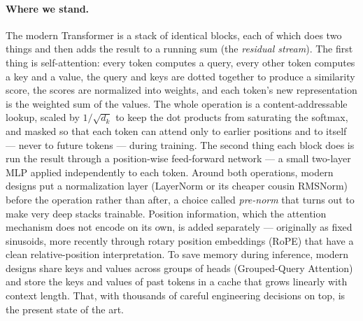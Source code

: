 \paragraph{Where we stand.}
The modern Transformer is a stack of identical blocks, each of which
does two things and then adds the result to a running sum (the
\emph{residual stream}). The first thing is self-attention: every
token computes a query, every other token computes a key and a
value, the query and keys are dotted together to produce a similarity
score, the scores are normalized into weights, and each token's new
representation is the weighted sum of the values. The whole
operation is a content-addressable lookup, scaled by
$1/\sqrt{d_k}$ to keep the dot products from saturating the softmax,
and masked so that each token can attend only to earlier positions
and to itself --- never to future tokens --- during training. The second thing each block does is run the result through
a position-wise feed-forward network --- a small two-layer MLP
applied independently to each token. Around both operations,
modern designs put a normalization layer (LayerNorm or its cheaper
cousin RMSNorm) before the operation rather than after, a choice
called \emph{pre-norm} that turns out to make very deep stacks
trainable. Position information, which the attention mechanism does
not encode on its own, is added separately --- originally as fixed
sinusoids, more recently through rotary position embeddings (RoPE)
that have a clean relative-position interpretation. To save memory
during inference, modern designs share keys and values across groups
of heads (Grouped-Query Attention) and store the keys and values of
past tokens in a cache that grows linearly with context length.
That, with thousands of careful engineering decisions on top, is the
present state of the art.

